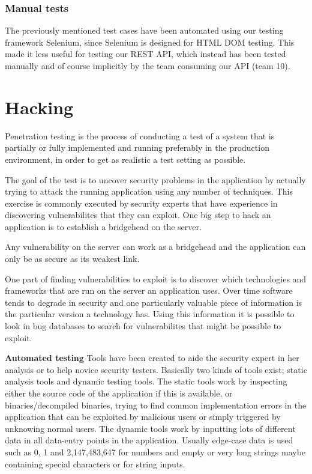 \documentclass[a4paper]{article}
\begin{document}
\subsubsection{Manual tests}
The previously mentioned test cases have been automated using our testing framework Selenium, since Selenium is designed for HTML DOM testing. This made it less useful for testing our REST API, which instead has been tested manually and of course implicitly by the team consuming our API (team 10).

\section{Hacking}\label{sec:hacking}
Penetration testing is the process of conducting a test of a system that is partially or fully implemented and running preferably in the production environment, in order to get as realistic a test setting as possible.

The goal of the test is to uncover security problems in the application by actually trying to attack the running application using any number of techniques. This exercise is commonly executed by security experts that have experience in discovering vulnerabilites that they can exploit.
One big step to hack an application is to establish a bridgehead on the server. 

Any vulnerability on the server can work as a bridgehead and the application can only be as secure as its weakest link.

One part of finding vulnerabilities to exploit is to discover which technologies and frameworks that are run on the server an application uses. Over time software tends to degrade in security and one particularly valuable piece of information is the particular version a technology has. 
Using this information it is possible to look in bug databases\cite{CVEdb} to search for vulnerabilites that might be possible to exploit.

\textbf{Automated testing}
Tools have been created to aide the security expert in her analysis or to help novice security testers. Basically two kinds of tools exist; static analysis tools and dynamic testing tools.
The static tools work by inspecting either the source code of the application if this is available, or binaries/decompiled binaries, trying to find common implementation errors in the application that can be exploited by malicious users or simply triggered by unknowing normal users.
The dynamic tools work by inputting lots of different data in all data-entry points in the application. Usually edge-case data is used such as 0, 1 and 2,147,483,647 for numbers and empty or very long strings maybe containing special characters or for string inputs.
\end{document}
